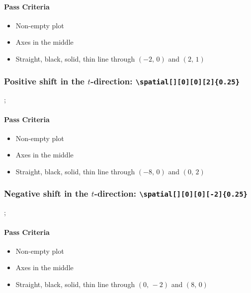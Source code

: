 \documentclass[pagesize,headsepline,parskip=half]{scrartcl}
\begin{document}
            \paragraph{Pass Criteria}
              \begin{itemize}
                \item Non-empty plot
                \item Axes in the middle
                \item Straight, black, solid, thin line through $(-2, \, 0)$ and $(2, \, 1)$
              \end{itemize}

            \subsubsection{Positive shift in the $t$-direction: \texttt{\textbackslash{}spatial[][0][0][2]\{0.25\}}}
              \begin{spacetimediagram}[grid, domain=-9:4, ymin=-4, ymax=4]
                ;
              \end{spacetimediagram}

              \paragraph{Pass Criteria}
                \begin{itemize}
                  \item Non-empty plot
                  \item Axes in the middle
                  \item Straight, black, solid, thin line through $(-8, \, 0)$ and $(0, \, 2)$
                \end{itemize}

            \subsubsection{Negative shift in the $t$-direction: \texttt{\textbackslash{}spatial[][0][0][-2]\{0.25\}}}
              \begin{spacetimediagram}[grid, domain=-4:9, ymin=-4, ymax=4]
                ;
              \end{spacetimediagram}

              \paragraph{Pass Criteria}
                \begin{itemize}
                  \item Non-empty plot
                  \item Axes in the middle
                  \item Straight, black, solid, thin line through $(0, \, -2)$ and $(8, \, 0)$
                \end{itemize}
\end{document}
